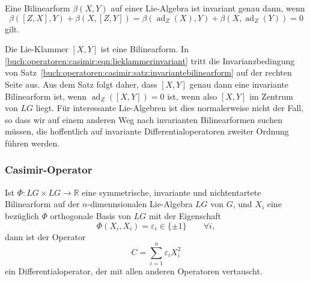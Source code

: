 \begin{satz}
\label{buch:operatoren:casimir:satz:invariantebilinearform}
Eine Bilinearform $\beta(X,Y)$ auf einer Lie-Algebra ist invariant
genau dann, wenn
\[
\beta([Z,X],Y) + \beta(X,[Z,Y])
=
\beta(\operatorname{ad}_Z(X),Y)
+
\beta(X,\operatorname{ad}_Z(Y))
=
0
\]
gilt.
\end{satz}

Die Lie-Klammer $[X,Y]$ ist eine Bilinearform.
In \eqref{buch:operatoren:casimir:eqn:lieklammerinvariant} tritt
die Invarianzbedingung von
Satz~\ref{buch:operatoren:casimir:satz:invariantebilinearform}
auf der rechten Seite aus.
Aus dem Satz folgt daher, dass $[X,Y]$ genau dann eine invariante
Bilinearform ist, wenn $\operatorname{ad}_Z([X,Y])=0$ ist, wenn also
$[X,Y]$ im Zentrum von $LG$ liegt.
Für interessante Lie-Algebren ist dies normalerweise nicht der Fall,
so dass wir auf einem anderen Weg nach invarianten Bilinearformen
suchen müssen, die hoffentlich auf invariante Differentialoperatoren
zweiter Ordnung führen werden.

%
%
\subsubsection{Casimir-Operator}

\begin{satz}
Ist $\Phi\colon LG\times LG\to\mathbb{R}$ eine symmetrische, invariante
und nichtentartete Bilinearform auf der $n$-dimennsionalen Lie-Algebra
$LG$ von $G$, und $X_i$ eine bezüglich $\Phi$
orthogonale Basis von $LG$ mit der Eigenschaft
\[
\Phi(X_i,X_i) = \varepsilon_i \in \{\pm 1\}\qquad\forall i,
\]
dann ist der Operator
\[
C
=
\sum_{i=1}^n \varepsilon_i X_i^2
\]
ein Differentialoperator, der mit allen anderen Operatoren vertauscht.
\end{satz}


